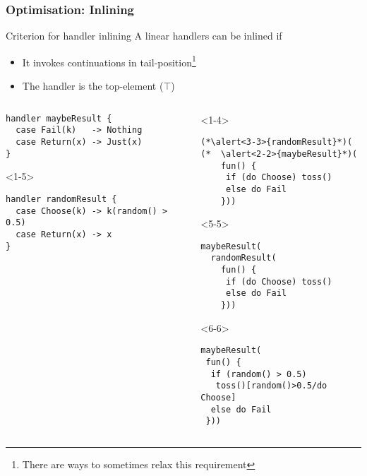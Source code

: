 \documentclass[10pt,compress]{beamer}
\begin{document}
\begin{frame}[fragile]
  \frametitle{Optimisation: Inlining}
  \begin{block}{Criterion for handler inlining}
    A linear handlers can be inlined if
    \begin{itemize}
      \item It invokes continuations in tail-position\footnote{There are ways to sometimes relax this requirement}
      \item The handler is the top-element ($\top$)
    \end{itemize}
  \end{block}
\vfill
\begin{columns}
\begin{column}{0.52\textwidth}
\begin{lstlisting}
handler maybeResult {
  case Fail(k)   -> Nothing
  case Return(x) -> Just(x)
}
\end{lstlisting}

\begin{onlyenv}<1-5>
\begin{lstlisting}
handler randomResult {
  case Choose(k) -> k(random() > 0.5)
  case Return(x) -> x
}
\end{lstlisting}
\end{onlyenv}
\end{column}
\begin{column}{0.48\textwidth}
\begin{onlyenv}<1-4>
\begin{lstlisting}
(*\alert<3-3>{randomResult}*)(
(*  \alert<2-2>{maybeResult}*)(
    fun() {
     if (do Choose) toss()
     else do Fail
    }))
\end{lstlisting}
\end{onlyenv}
\begin{onlyenv}<5-5>
\begin{lstlisting}
maybeResult(
  randomResult(
    fun() {
     if (do Choose) toss()
     else do Fail
    }))
\end{lstlisting}
\end{onlyenv}
\begin{onlyenv}<6-6>
\begin{lstlisting}
maybeResult(
 fun() {
  if (random() > 0.5) 
   toss()[random()>0.5/do Choose]
  else do Fail
 }))
\end{lstlisting}
\end{onlyenv}
\end{column}
\end{columns}


\end{frame}
\end{document}
